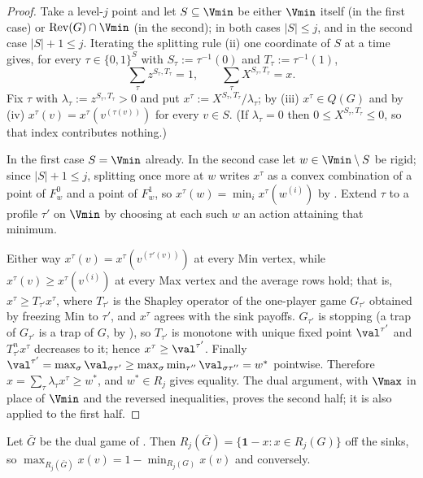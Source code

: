 \begin{proof}
Take a level-$j$ point and let $S\subseteq\Vmin$ be either $\Vmin$ itself (in
the first case) or $\mathrm{Rev}(G)\cap\Vmin$ (in the second); in both cases
$|S|\le j$, and in the second case $|S|+1\le j$. Iterating the splitting rule
(ii) one coordinate of $S$ at a time gives, for every $\tau\in\{0,1\}^{S}$ with
$S_\tau:=\tau^{-1}(0)$ and $T_\tau:=\tau^{-1}(1)$,
\[
  \sum_{\tau}z^{S_\tau,T_\tau}=1,\qquad
  \sum_{\tau}X^{S_\tau,T_\tau}=x .
\]
Fix $\tau$ with $\lambda_\tau:=z^{S_\tau,T_\tau}>0$ and put
$x^{\tau}:=X^{S_\tau,T_\tau}/\lambda_\tau$; by (iii) $x^{\tau}\in Q(G)$ and by
(iv) $x^{\tau}(v)=x^{\tau}(v^{(\tau(v))})$ for every $v\in S$. (If
$\lambda_\tau=0$ then $0\le X^{S_\tau,T_\tau}\le0$, so that index contributes
nothing.)

In the first case $S=\Vmin$ already. In the second case let $w\in\Vmin\setminus
S$ be rigid; since $|S|+1\le j$, splitting once more at $w$ writes $x^{\tau}$
as a convex combination of a point of $F_w^{0}$ and a point of $F_w^{1}$, so
$x^{\tau}(w)=\min_ix^{\tau}(w^{(i)})$ by . Extend $\tau$ to
a profile $\tau'$ on $\Vmin$ by choosing at each such $w$ an action attaining
that minimum.

Either way $x^{\tau}(v)=x^{\tau}(v^{(\tau'(v))})$ at every Min vertex, while
$x^{\tau}(v)\ge x^{\tau}(v^{(i)})$ at every Max vertex and the average rows
hold; that is, $x^{\tau}\ge T_{\tau'}x^{\tau}$, where $T_{\tau'}$ is the
Shapley operator of the one-player game $G_{\tau'}$ obtained by freezing Min to
$\tau'$, and $x^{\tau}$ agrees with the sink payoffs. $G_{\tau'}$ is stopping
(a trap of $G_{\tau'}$ is a trap of $G$, by ), so
$T_{\tau'}$ is monotone with unique fixed point $\val^{\tau'}$ and
$T^{n}_{\tau'}x^{\tau}$ decreases to it; hence $x^{\tau}\ge\val^{\tau'}$.
Finally $\val^{\tau'}=\max_\sigma\val_{\sigma\tau'}\ge
\max_\sigma\min_{\tau''}\val_{\sigma\tau''}=w^{\ast}$ pointwise. Therefore
$x=\sum_\tau\lambda_\tau x^{\tau}\ge w^{\ast}$, and $w^{\ast}\in R_j$ gives
equality. The dual argument, with $\Vmax$ in place of $\Vmin$ and the reversed
inequalities, proves the second half; it is also  applied to
the first half.
\end{proof}

\begin{corollary}\label{cl:duality}
Let $\bar G$ be the dual game of . Then
$R_j(\bar G)=\{\mathbf 1-x:x\in R_j(G)\}$ off the sinks, so
$\max_{R_j(\bar G)}x(v)=1-\min_{R_j(G)}x(v)$ and conversely.
\end{corollary}

